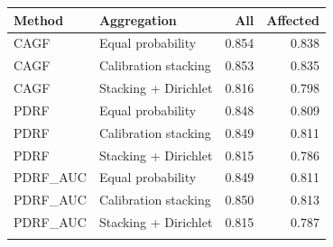\begin{tabular}{llrr}
\toprule
Method & Aggregation & All & Affected\\
\midrule
CAGF & Equal probability & 0.854 & 0.838\\
CAGF & Calibration stacking & 0.853 & 0.835\\
CAGF & Stacking + Dirichlet & 0.816 & 0.798\\
\addlinespace
PDRF & Equal probability & 0.848 & 0.809\\
PDRF & Calibration stacking & 0.849 & 0.811\\
PDRF & Stacking + Dirichlet & 0.815 & 0.786\\
\addlinespace
PDRF\_AUC & Equal probability & 0.849 & 0.811\\
PDRF\_AUC & Calibration stacking & 0.850 & 0.813\\
PDRF\_AUC & Stacking + Dirichlet & 0.815 & 0.787\\
\addlinespace
\bottomrule
\end{tabular}
